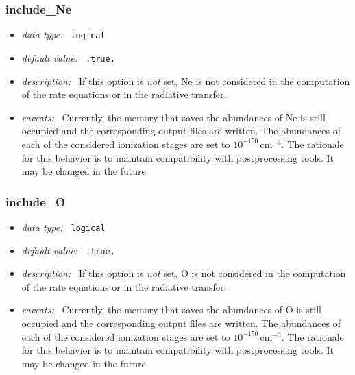 \documentclass[a4paper,10pt]{article}
\begin{document}
\subsubsection{include\_Ne}
\label{opt:includene}
\begin{itemize}
 \item \textit{data type:~} \texttt{logical}
 \item \textit{default value:~} \texttt{.true.}
 \item \textit{description:~} If this option is 
 \textit{not} set, Ne is not considered 
 in the computation of the rate equations or in the
 radiative transfer. 
 \item \textit{caveats:~} Currently, the memory that saves the 
 abundances of Ne is still occupied and the corresponding output
 files are written. The abundances of each of the considered ionization
 stages are set to $10^{-150}\,\mathrm{cm^{-3}}$. The rationale for
 this behavior is to maintain compatibility with postprocessing
 tools. It may be changed in the future.
\end{itemize}


\subsubsection{include\_O}
\label{opt:includeo}
\begin{itemize}
 \item \textit{data type:~} \texttt{logical}
 \item \textit{default value:~} \texttt{.true.}
 \item \textit{description:~} If this option is 
 \textit{not} set, O is not considered 
 in the computation of the rate equations or in the
 radiative transfer. 
 \item \textit{caveats:~} Currently, the memory that saves the 
 abundances of O is still occupied and the corresponding output
 files are written. The abundances of each of the considered ionization
 stages are set to $10^{-150}\,\mathrm{cm^{-3}}$. The rationale for
 this behavior is to maintain compatibility with postprocessing
 tools. It may be changed in the future.
\end{itemize}
\end{document}
